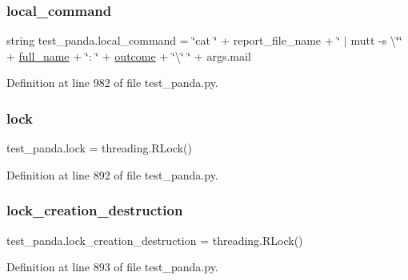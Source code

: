 \subsubsection{\texorpdfstring{local\+\_\+command}{local\_command}}
{\footnotesize\ttfamily string test\+\_\+panda.\+local\+\_\+command = \char`\"{}cat \char`\"{} + report\+\_\+file\+\_\+name + \char`\"{} $\vert$ mutt -\/s \textbackslash{}\char`\"{}\char`\"{} + \hyperlink{namespacetest__panda_a99098d1c922dd11b8a58c871b54d24eb}{full\+\_\+name} + \char`\"{}\+: \char`\"{} + \hyperlink{namespacetest__panda_a39a6d10997e19157bd01ab927a81c044}{outcome} + \char`\"{}\textbackslash{}\char`\"{} \char`\"{} + args.\+mail}



Definition at line 982 of file test\+\_\+panda.\+py.

\mbox{\label{namespacetest__panda_adefe19732bebd85616aae9464f493d15}} 
\subsubsection{\texorpdfstring{lock}{lock}}
{\footnotesize\ttfamily test\+\_\+panda.\+lock = threading.\+R\+Lock()}



Definition at line 892 of file test\+\_\+panda.\+py.

\mbox{\label{namespacetest__panda_aceae9d158f2cdcc15b9801da8011d5fd}} 
\subsubsection{\texorpdfstring{lock\+\_\+creation\+\_\+destruction}{lock\_creation\_destruction}}
{\footnotesize\ttfamily test\+\_\+panda.\+lock\+\_\+creation\+\_\+destruction = threading.\+R\+Lock()}



Definition at line 893 of file test\+\_\+panda.\+py.

\mbox{\label{namespacetest__panda_a7f244fa9799d45d02e0f266989bf16f7}} 
